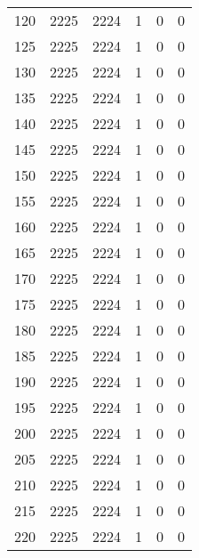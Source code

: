 \begin{longtable}{|l|l|l|l|l|l|}
120 & 2225 & 2224 & 1 & 0 & 0 \\
125 & 2225 & 2224 & 1 & 0 & 0 \\
130 & 2225 & 2224 & 1 & 0 & 0 \\
135 & 2225 & 2224 & 1 & 0 & 0 \\
140 & 2225 & 2224 & 1 & 0 & 0 \\
145 & 2225 & 2224 & 1 & 0 & 0 \\
150 & 2225 & 2224 & 1 & 0 & 0 \\
155 & 2225 & 2224 & 1 & 0 & 0 \\
160 & 2225 & 2224 & 1 & 0 & 0 \\
165 & 2225 & 2224 & 1 & 0 & 0 \\
170 & 2225 & 2224 & 1 & 0 & 0 \\
175 & 2225 & 2224 & 1 & 0 & 0 \\
180 & 2225 & 2224 & 1 & 0 & 0 \\
185 & 2225 & 2224 & 1 & 0 & 0 \\
190 & 2225 & 2224 & 1 & 0 & 0 \\
195 & 2225 & 2224 & 1 & 0 & 0 \\
200 & 2225 & 2224 & 1 & 0 & 0 \\
205 & 2225 & 2224 & 1 & 0 & 0 \\
210 & 2225 & 2224 & 1 & 0 & 0 \\
215 & 2225 & 2224 & 1 & 0 & 0 \\
220 & 2225 & 2224 & 1 & 0 & 0 \\

	\bottomrule
\end{longtable}